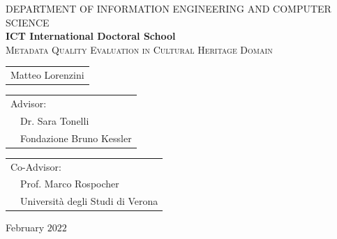 \documentclass[epsfig,a4paper,12pt,titlepage]{book}
\newcommand{\clearemptydoublepage}{\newpage{\pagestyle{empty}\cleardoublepage}}
\begin{document}
\pagestyle{plain}

\newpage
\clearemptydoublepage
\thispagestyle{empty}
\begin{center}


\begin{figure}[h!]
  \centerline{}
\end{figure}

\hrulefill

DEPARTMENT OF INFORMATION ENGINEERING AND COMPUTER SCIENCE\\
\textbf{ICT International Doctoral School}\\


\vspace{1 cm} 
\Huge\textsc{Metadata Quality Evaluation in Cultural Heritage Domain\\} %

\vspace{0.3 cm}

\begin{center}
\begin{tabular}{l}
\huge{Matteo Lorenzini}\\
\end{tabular}
\end{center}
\vspace{1 cm} 
\begin{flushleft}
\begin{tabular}{ll}
\multicolumn{2}{l}{\large Advisor:}\\
 & \large Dr. Sara Tonelli\\
 & \large Fondazione Bruno Kessler\\
\end{tabular}
\end{flushleft}

\begin{flushleft}
\begin{tabular}{ll}
\multicolumn{2}{l}{\large Co-Advisor:}\\
 & \large Prof. Marco Rospocher\\
 & \large Universit\`a degli Studi di Verona\\
\end{tabular}
\end{flushleft}

\hrulefill

\normalsize
February $2022$
\end{center}
\end{document}
